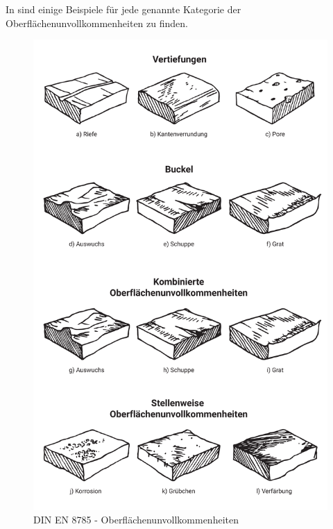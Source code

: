 In  sind einige Beispiele für jede genannte Kategorie der Oberflächenunvollkommenheiten zu finden. 

\begin{figure}[h]
	\centering
	\includegraphics[width=0.7\linewidth]{img/din_en_8785_beispiele}
	\caption[DIN EN 8785 - Oberflächenunvollkommenheiten]{DIN EN 8785 - Oberflächenunvollkommenheiten}
	\label{fig:din-en-8785-beispiele}
\end{figure}









 






          


